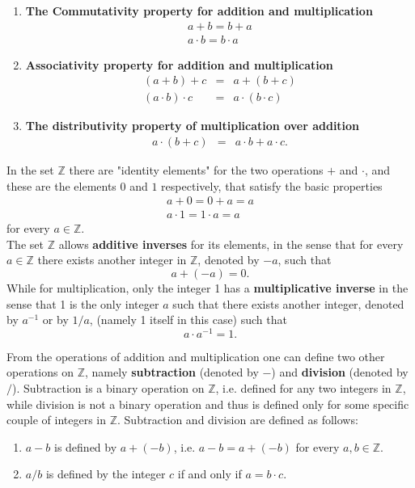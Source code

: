 \documentclass[12pt,letterpaper]{book}
\begin{document}
\begin{enumerate}
\item \textbf{The Commutativity property for addition and multiplication}
\begin{eqnarray*}
a+b=b+a\\
a\cdot b=b\cdot a
\end{eqnarray*}
\item \textbf{Associativity property for addition and multiplication}
\begin{eqnarray*}
(a+b)+c&=&a+(b+c)\\
(a\cdot b)\cdot c&=& a\cdot (b\cdot c)
\end{eqnarray*}
\item \textbf{The distributivity property of multiplication over addition}
\begin{eqnarray*}
a\cdot (b+c)&=&a\cdot b+a\cdot c.
\end{eqnarray*}
\end{enumerate}
 In the set $\mathbb{Z}$ there are
"identity elements" for the two operations $+$ and $\cdot$, and
these are the elements $0$ and $1$ respectively, that satisfy the
basic properties
\begin{eqnarray*}
a + 0 =0+a=a\\
a\cdot 1 = 1\cdot a=a
\end{eqnarray*}
for every $a\in\mathbb{Z}$.\\

The set $\mathbb{Z}$ allows {\bf additive inverses} for its
elements, in the sense that for every $a\in\mathbb{Z}$ there exists
another integer in $\mathbb{Z}$, denoted by $-a$, such that
\begin{equation}
a+(-a)=0.
\end{equation}
While for multiplication, only the integer 1 has a {\bf
multiplicative inverse} in the sense that 1 is the only integer $a$
such that there exists another integer, denoted by $a^{-1}$ or by
$1/a$, (namely 1 itself in this case) such that
\begin{equation}
a\cdot a^{-1}=1.
\end{equation}

From the operations of addition and multiplication one can define
two other operations on $\mathbb{Z}$, namely {\bf subtraction}
(denoted by $-$) and {\bf division} (denoted by $/$). Subtraction is
a binary operation on $\mathbb{Z}$, i.e. defined for any two
integers in $\mathbb{Z}$, while division is not a binary operation
and thus is defined only for some specific couple of integers in
$\mathbb{Z}$. Subtraction and division are defined as follows:
\begin{enumerate}

\item $a-b$ is defined by $a+(-b)$, i.e. $a-b=a+(-b)$ for every $a,b\in\mathbb{Z}.$
\item $a/b$ is defined by the integer $c$ if and only if $a=b\cdot c$.

\end{enumerate}
\end{document}
